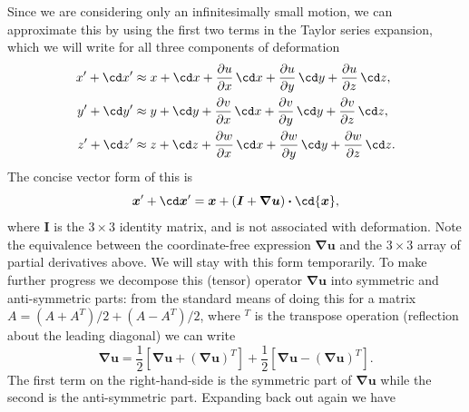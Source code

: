 \documentclass[a4paper,11pt]		{report}
\begin{document}
Since we are considering only an infinitesimally small motion, we can
approximate this by using the first two terms in the Taylor series
expansion, which we will write for all three components of deformation
\begin{align*}
x^\prime + \cd x^\prime & \approx x +\cd x +
 \frac{\partial u}{\partial x}\,\cd x +
 \frac{\partial u}{\partial y}\,\cd y +
 \frac{\partial u}{\partial z}\,\cd z,\\
y^\prime + \cd y^\prime & \approx y +\cd y +
 \frac{\partial v}{\partial x}\,\cd x +
 \frac{\partial v}{\partial y}\,\cd y +
 \frac{\partial v}{\partial z}\,\cd z,\\
z^\prime + \cd z^\prime & \approx z +\cd z +
 \frac{\partial w}{\partial x}\,\cd x +
 \frac{\partial w}{\partial y}\,\cd y +
 \frac{\partial w}{\partial z}\,\cd z.
\end{align*}
The concise vector form of this is
\[
\bm{x}^\prime + \cd\bm{x}^\prime=
\bm{x}+(\bm{I}+\bm{\nabla u})\bm{\cdot}\cd{\bm{x}},
\]
where $\bm{I}$ is the $3\times3$ identity matrix, and is not
associated with deformation. Note the equivalence between the
coordinate-free expression $\bm{\nabla u}$ and the $3\times3$ array of
partial derivatives above. We will stay with this form temporarily. To
make further progress we decompose this (tensor) operator $\bm{\nabla
u}$ into symmetric and anti-symmetric parts: from the standard means
of doing this for a matrix $A=(A+A^T)/2+(A-A^T)/2$, where $^T$ is the
transpose operation (reflection about the leading diagonal) we can
write
\[
\bm{\nabla u} =
 \frac{1}{2}\left[\bm{\nabla u}+(\bm{\nabla u})^T\right]+
 \frac{1}{2}\left[\bm{\nabla u}-(\bm{\nabla u})^T\right].
\]
The first term on the right-hand-side is the symmetric part of
$\bm{\nabla u}$ while the second is the anti-symmetric part. Expanding
back out again we have 
\end{document}
